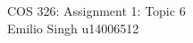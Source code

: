 \documentclass[12pt]{article}
\begin{document}
\begin{titlepage}

\begin{center}
\begin{huge}
COS 326: Assignment 1: Topic 6
\\
Emilio Singh u14006512
\end{huge}

\end{center}
\end{titlepage}
\tableofcontents
\pagebreak



\end{document}
